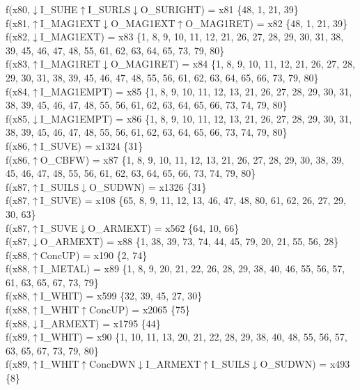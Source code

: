 f(x80,$\downarrow$I\_SUHE$\uparrow$I\_SURLS$\downarrow$O\_SURIGHT) = x81 \{48, 1, 21, 39\} \\  
f(x81,$\uparrow$I\_MAG1EXT$\downarrow$O\_MAG1EXT$\uparrow$O\_MAG1RET) = x82 \{48, 1, 21, 39\} \\  
f(x82,$\downarrow$I\_MAG1EXT) = x83 \{1, 8, 9, 10, 11, 12, 21, 26, 27, 28, 29, 30, 31, 38, 39, 45, 46, 47, 48, 55, 61, 62, 63, 64, 65, 73, 79, 80\} \\  
f(x83,$\uparrow$I\_MAG1RET$\downarrow$O\_MAG1RET) = x84 \{1, 8, 9, 10, 11, 12, 21, 26, 27, 28, 29, 30, 31, 38, 39, 45, 46, 47, 48, 55, 56, 61, 62, 63, 64, 65, 66, 73, 79, 80\} \\  
f(x84,$\uparrow$I\_MAG1EMPT) = x85 \{1, 8, 9, 10, 11, 12, 13, 21, 26, 27, 28, 29, 30, 31, 38, 39, 45, 46, 47, 48, 55, 56, 61, 62, 63, 64, 65, 66, 73, 74, 79, 80\} \\  
f(x85,$\downarrow$I\_MAG1EMPT) = x86 \{1, 8, 9, 10, 11, 12, 13, 21, 26, 27, 28, 29, 30, 31, 38, 39, 45, 46, 47, 48, 55, 56, 61, 62, 63, 64, 65, 66, 73, 74, 79, 80\} \\  
f(x86,$\uparrow$I\_SUVE) = x1324 \{31\} \\  
f(x86,$\uparrow$O\_CBFW) = x87 \{1, 8, 9, 10, 11, 12, 13, 21, 26, 27, 28, 29, 30, 38, 39, 45, 46, 47, 48, 55, 56, 61, 62, 63, 64, 65, 66, 73, 74, 79, 80\} \\  
f(x87,$\uparrow$I\_SUILS$\downarrow$O\_SUDWN) = x1326 \{31\} \\  
f(x87,$\uparrow$I\_SUVE) = x108 \{65, 8, 9, 11, 12, 13, 46, 47, 48, 80, 61, 62, 26, 27, 29, 30, 63\} \\  
f(x87,$\uparrow$I\_SUVE$\downarrow$O\_ARMEXT) = x562 \{64, 10, 66\} \\  
f(x87,$\downarrow$O\_ARMEXT) = x88 \{1, 38, 39, 73, 74, 44, 45, 79, 20, 21, 55, 56, 28\} \\  
f(x88,$\uparrow$ConcUP) = x190 \{2, 74\} \\  
f(x88,$\uparrow$I\_METAL) = x89 \{1, 8, 9, 20, 21, 22, 26, 28, 29, 38, 40, 46, 55, 56, 57, 61, 63, 65, 67, 73, 79\} \\  
f(x88,$\uparrow$I\_WHIT) = x599 \{32, 39, 45, 27, 30\} \\  
f(x88,$\uparrow$I\_WHIT$\uparrow$ConcUP) = x2065 \{75\} \\  
f(x88,$\downarrow$I\_ARMEXT) = x1795 \{44\} \\  
f(x89,$\uparrow$I\_WHIT) = x90 \{1, 10, 11, 13, 20, 21, 22, 28, 29, 38, 40, 48, 55, 56, 57, 63, 65, 67, 73, 79, 80\} \\  
f(x89,$\uparrow$I\_WHIT$\uparrow$ConcDWN$\downarrow$I\_ARMEXT$\uparrow$I\_SUILS$\downarrow$O\_SUDWN) = x493 \{8\} \\  
